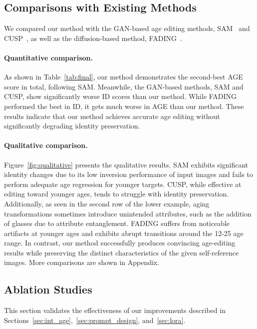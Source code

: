 \subsection{Comparisons with Existing Methods}
\label{sec:comparison}

We compared our method with the GAN-based age editing methods, SAM~\cite{alaluf2021only} and CUSP~\cite{gomez2022custom}, as well as the diffusion-based method, FADING~\cite{chen2023face}.


\paragraph{Quantitative comparison.}
As shown in Table~\ref{tab:final}, our method demonstrates the second-best AGE score in total, following SAM.
Meanwhile, the GAN-based methods, SAM and CUSP, show significantly worse ID scores than our method.
While FADING performed the best in ID, it gets much worse in AGE than our method.
These results indicate that our method achieves accurate age editing without significantly degrading identity preservation. 


\paragraph{Qualitative comparison.}
Figure~\ref{fig:qualitative} presents the qualitative results.
SAM exhibits significant identity changes due to its low inversion performance of input images and fails to perform adequate age regression for younger targets. 
CUSP, while effective at editing toward younger ages, tends to struggle with identity preservation.
Additionally, as seen in the second row of the lower example, aging transformations sometimes introduce unintended attributes, such as the addition of glasses due to attribute entanglement. 
FADING suffers from noticeable artifacts at younger ages and exhibits abrupt transitions around the 12-25 age range.
In contrast, our method successfully produces convincing age-editing results while preserving the distinct characteristics of the given self-reference images. 
More comparisons are shown in Appendix. 

\subsection{Ablation Studies}
This section validates the effectiveness of our improvements described in Sections~\ref{sec:int_age},~\ref{sec:prompt_design}, and~\ref{sec:lora}.
\label{sec:ablation}


